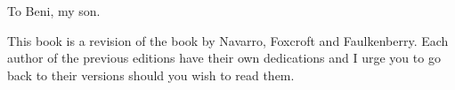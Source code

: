 

\newpage

\vspace*{7cm}
\begin{center}
{\it \large

To Beni, my son.

}
\end{center}

\vspace*{7cm}
\begin{center}
{\it \large

This book is a revision of the book by Navarro, Foxcroft and Faulkenberry. Each author of the previous editions have their own dedications and I urge you to go back to their versions should you wish to read them.
}
\end{center}

